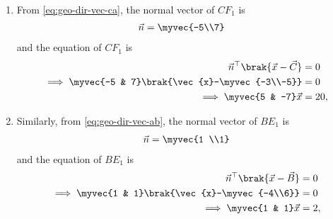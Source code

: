 \\ \solution
\begin{enumerate}
\item 
	From 
		\eqref{eq:geo-dir-vec-ca},
the normal vector of $CF_1$ is 
\begin{align}
\vec{n}&=\myvec{-5\\7} 
\end{align}
and the equation of $CF_1$ is
\begin{align}
\vec{n}^{\top}\brak{\vec{x}-\vec{C}}&=0 \\
\implies 
\myvec{-5 & 7}\brak{\vec{x}-\myvec{-3\\-5}}&=0  \\
	\implies \myvec{5 & -7}\vec{x}&=20
		\label{eq:geo-alt-cf},
\end{align}
\item Similarly, 
	from 
		\eqref{eq:geo-dir-vec-ab},
the normal vector of $BE_1$ is 
\begin{align}
\vec{n}= \myvec{1 \\1}
\end{align}
and the equation of  $BE_1$ is
\begin{align}
\vec{n}^{\top}\brak{\vec{x}-\vec{B}}&=0 \\
	\implies \myvec{1 & 1}\brak{\vec{x}-\myvec{-4\\6}}&=0 \\
	\implies \myvec{1 & 1}\vec{x}&=2
		\label{eq:geo-alt-be},
\end{align}
\end{enumerate}


